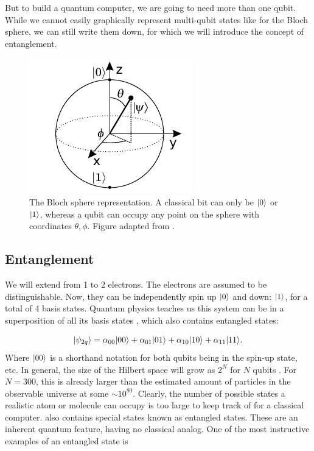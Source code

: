 But to build a quantum computer, we are going to need more than one qubit. 
While we cannot easily graphically represent multi-qubit states like for the Bloch sphere, we can still write them down, for which we will introduce the concept of entanglement.

\begin{figure}
	\centering
	\includegraphics[width=.34\linewidth]{figures/BlochSphereCropped.pdf}
	\caption{The Bloch sphere representation. A classical bit can only be $\lvert0\rangle$ or $\lvert1\rangle$, whereas a qubit can occupy any point on the sphere with coordinates $\theta, \phi$. Figure adapted from \cite{Jones2012}.}
	\label{fig:BlochSphere}
\end{figure}

\subsection{Entanglement}\label{sub:Entanglement}

We will extend from 1 to 2 electrons. 
The electrons are assumed to be distinguishable. 
Now, they can be independently spin up $\lvert0\rangle$ and down: $\lvert1\rangle$, for a total of 4 basis states.
Quantum physics teaches us this system can be in a superposition of all its basis states \cite{Nielsen2011}, which also contains entangled states:

\begin{equation}\label{eq:TwoQubits}
	\lvert\psi_{2q}\rangle = 
	\alpha_{00} \lvert00\rangle + \alpha_{01} \lvert01\rangle + \alpha_{10} \lvert10\rangle + \alpha_{11} \lvert11\rangle.
\end{equation}
Where $\lvert00\rangle$ is a shorthand notation for both qubits being in the spin-up state, etc.
In general, the size of the Hilbert space will grow as $2^N$ for $N$ qubits \cite{Nielsen2011,Henriet2020}. 
For $N=300$, this is already larger than the estimated amount of particles in the observable universe at some $\sim 10^{80}$. 
Clearly, the number of possible states a realistic atom or molecule can occupy is too large to keep track of for a classical computer.
 also contains special states known as entangled states. 
These are an inherent quantum feature, having no classical analog.
One of the most instructive examples of an entangled state is 

